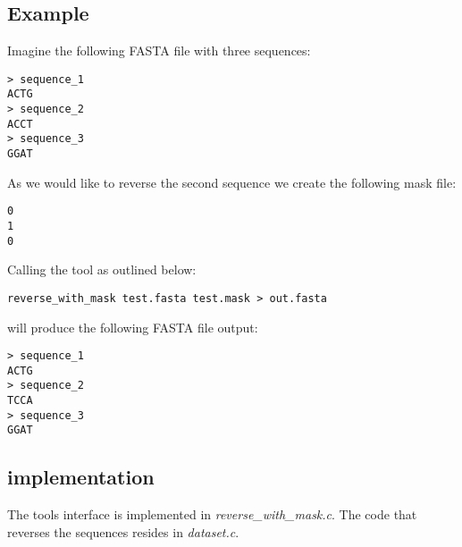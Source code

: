 \subsection{Example}
Imagine the following FASTA file with three sequences:
\begin{lstlisting}
> sequence_1
ACTG
> sequence_2
ACCT
> sequence_3
GGAT
\end{lstlisting}
As we would like to reverse the second sequence we create the
following mask file:
\begin{lstlisting}
0
1
0
\end{lstlisting}
Calling the tool as outlined below:
\begin{lstlisting}
reverse_with_mask test.fasta test.mask > out.fasta
\end{lstlisting}
will produce the following FASTA file output:
\begin{lstlisting}
> sequence_1
ACTG
> sequence_2
TCCA
> sequence_3
GGAT
\end{lstlisting}

\subsection{implementation}
The tools interface is implemented in \emph{reverse\_with\_mask.c}.
The code that reverses the sequences resides in \emph{dataset.c}.

